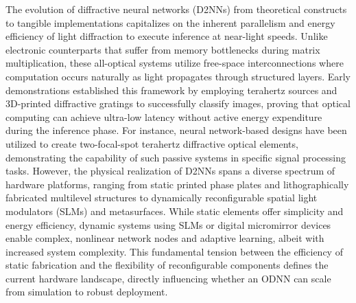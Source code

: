 \documentclass[11pt]{article}
\begin{document}
The evolution of diffractive neural networks (D2NNs) from theoretical constructs to tangible implementations capitalizes on the inherent parallelism and energy efficiency of light diffraction to execute inference at near-light speeds. Unlike electronic counterparts that suffer from memory bottlenecks during matrix multiplication, these all-optical systems utilize free-space interconnections where computation occurs naturally as light propagates through structured layers. Early demonstrations established this framework by employing terahertz sources and 3D-printed diffractive gratings to successfully classify images, proving that optical computing can achieve ultra-low latency without active energy expenditure during the inference phase. For instance, neural network-based designs have been utilized to create two-focal-spot terahertz diffractive optical elements, demonstrating the capability of such passive systems in specific signal processing tasks. \citep{doi_10_1109_tthz_2023_3344020_a0a550ba} However, the physical realization of D2NNs spans a diverse spectrum of hardware platforms, ranging from static printed phase plates and lithographically fabricated multilevel structures to dynamically reconfigurable spatial light modulators (SLMs) and metasurfaces. While static elements offer simplicity and energy efficiency, dynamic systems using SLMs or digital micromirror devices enable complex, nonlinear network nodes and adaptive learning, albeit with increased system complexity. This fundamental tension between the efficiency of static fabrication and the flexibility of reconfigurable components defines the current hardware landscape, directly influencing whether an ODNN can scale from simulation to robust deployment. \citep{doi_10_1155_2021_6667495_60f04b14} \citep{doi_10_1364_josab_497148_b087424b}
\end{document}
